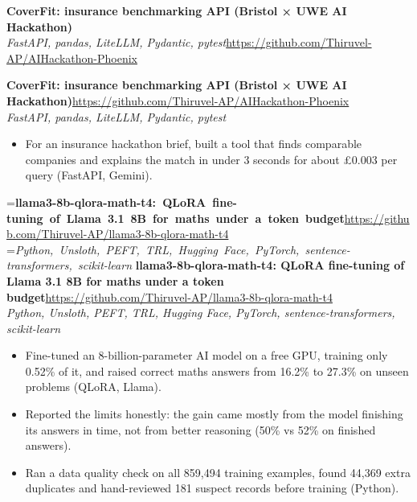 \documentclass[a4paper,11pt]{article}
\newcommand{\project}[3]{%
  \textbf{#1}\hfill#3\\ {\color{muted}\small\textit{#2}}\par}
\newcommand{\gap}{\vspace{5pt}}
\begin{document}
\else
\textbf{CoverFit: insurance benchmarking API (Bristol × UWE AI Hackathon)}\\ {\color{muted}\small\textit{FastAPI, pandas, LiteLLM, Pydantic, pytest}}\hfill{\small\url{https://github.com/Thiruvel-AP/AIHackathon-Phoenix}}\par
\fi
\else
\project{CoverFit: insurance benchmarking API (Bristol × UWE AI Hackathon)}{FastAPI, pandas, LiteLLM, Pydantic, pytest}{\url{https://github.com/Thiruvel-AP/AIHackathon-Phoenix}}
\fi
\begin{itemize}
  \item For an insurance hackathon brief, built a tool that finds comparable companies and explains the match in under 3 seconds for about £0.003 per query (FastAPI, Gemini).
\end{itemize}
\gap
{}
=\hbox{\textbf{llama3-8b-qlora-math-t4: QLoRA fine-tuning of Llama 3.1 8B for maths under a token budget}\hspace{1em}\url{https://github.com/Thiruvel-AP/llama3-8b-qlora-math-t4}}%
=\hbox{{\small\textit{Python, Unsloth, PEFT, TRL, Hugging Face, PyTorch, sentence-transformers, scikit-learn}}}%
\ifdim\wd0>\linewidth
\ifdim\wd2>\linewidth
\textbf{llama3-8b-qlora-math-t4: QLoRA fine-tuning of Llama 3.1 8B for maths under a token budget}\\ {\color{muted}\small\textit{Python, Unsloth, PEFT, TRL, Hugging Face, PyTorch, sentence-transformers, scikit-learn}}\\ \hspace*{\fill}{\small\url{https://github.com/Thiruvel-AP/llama3-8b-qlora-math-t4}}\par
\else
\textbf{llama3-8b-qlora-math-t4: QLoRA fine-tuning of Llama 3.1 8B for maths under a token budget}\\ {\color{muted}\small\textit{Python, Unsloth, PEFT, TRL, Hugging Face, PyTorch, sentence-transformers, scikit-learn}}\hfill{\small\url{https://github.com/Thiruvel-AP/llama3-8b-qlora-math-t4}}\par
\fi
\else
\project{llama3-8b-qlora-math-t4: QLoRA fine-tuning of Llama 3.1 8B for maths under a token budget}{Python, Unsloth, PEFT, TRL, Hugging Face, PyTorch, sentence-transformers, scikit-learn}{\url{https://github.com/Thiruvel-AP/llama3-8b-qlora-math-t4}}
\fi
\begin{itemize}
  \item Fine-tuned an 8-billion-parameter AI model on a free GPU, training only 0.52\% of it, and raised correct maths answers from 16.2\% to 27.3\% on unseen problems (QLoRA, Llama).
  \item Reported the limits honestly: the gain came mostly from the model finishing its answers in time, not from better reasoning (50\% vs 52\% on finished answers).
  \item Ran a data quality check on all 859,494 training examples, found 44,369 extra duplicates and hand-reviewed 181 suspect records before training (Python).
\end{itemize}
\end{document}
